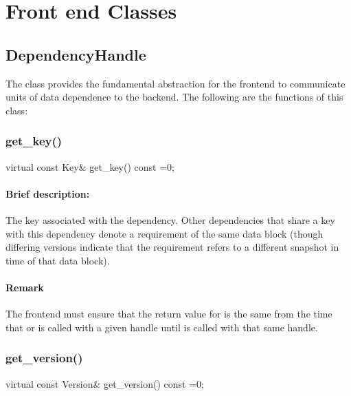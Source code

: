 
\section{Front end Classes}

\subsection{{DependencyHandle}}
The class  provides the fundamental abstraction for the frontend to communicate units of
data dependence to the backend. The following are the functions of this class:

\subsubsection{get\_key()}
\begin{CppCode}
    virtual const Key&
    get_key() const =0;
\end{CppCode}

\paragraph{Brief description:} The key associated with the dependency.
       Other dependencies that share a key with this dependency denote a requirement of the same
       data block (though differing versions indicate that the requirement refers to a different
       snapshot in time of that data block).
     
\paragraph{Remark} The frontend must ensure that the return value for  is the same from the
      time that  or  is called with a given
       handle until  is called with that same handle.


\subsubsection{get\_version()}
\begin{CppCode}
    virtual const Version&
    get_version() const =0;
\end{CppCode}

